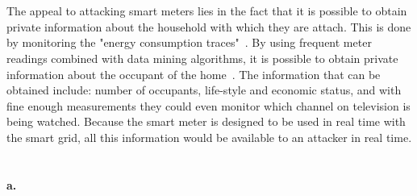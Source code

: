 \documentclass[letterpaper]{article}
\begin{document}
\section{}
The appeal to attacking smart meters lies in the fact that it is possible to obtain private information about the household with which they are attach. This is done by monitoring the "energy consumption traces"~\cite{RajagopalanS.R2011SmpA}. By using frequent meter readings combined with data mining algorithms, it is possible to obtain private information about the occupant of the home~\cite{RajagopalanS.R2011SmpA}. The information that can be obtained include: number of occupants, life-style and economic status, and with fine enough measurements they could even monitor which channel on television is being watched. Because the smart meter is designed to be used in real time with the smart grid, all this information would be available to an attacker in real time. 



\section{}

\paragraph{a.}
\end{document}
